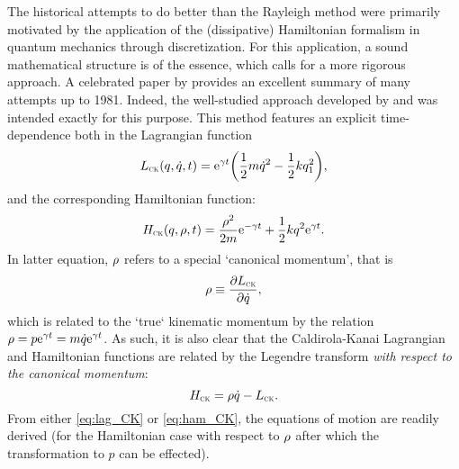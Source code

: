 The historical attempts to do better than the Rayleigh method were primarily motivated by the application of the (dissipative) Hamiltonian formalism in quantum mechanics through discretization. For this application, a sound mathematical structure is of the essence, which calls for a more rigorous approach. A celebrated paper by
\citet{Dekker1981} provides an excellent summary of many attempts up to 1981. Indeed, the well-studied approach developed by \citet{Caldirola1941} and \citet{Kanai1948} was intended exactly for this purpose. This method features an explicit time-dependence both in the Lagrangian function
\begin{equation}
    L_\text{\tiny{\textsc{CK}}}(q, \dot{q}, t) = \mathrm{e}^{\gamma t}\qty(\frac{1}{2}m\dot{q}^2 - \frac{1}{2}kq_1^2),
    \label{eq:lag_CK}
\end{equation}
and the corresponding Hamiltonian function:
\begin{equation}
    H_\text{\tiny{\textsc{CK}}}(q, \rho, t) = \frac{\rho^2}{2m}\mathrm{e}^{-\gamma t} + \frac{1}{2}kq^2\mathrm{e}^{\gamma t}.
    \label{eq:ham_CK}
\end{equation}
In latter equation, $\rho$ refers to a special `canonical momentum', that is
\begin{equation}
    \rho \equiv \pdv{\ensuremath{L_\text{\tiny{\textsc{CK}}}}}{\dot{q}},
    \label{eq:can_momentum}
\end{equation}
which is related to the `true` kinematic momentum by the relation $\rho = p\mathrm{e}^{\gamma
t} = m\dot{q}\mathrm{e}^{\gamma t}$. As such, it is also clear that the Caldirola-Kanai Lagrangian and Hamiltonian functions are related by the Legendre transform \emph{with respect to the canonical momentum}:
$$ H_\text{\tiny{\textsc{CK}}} = \rho \dot{q} - L_\text{\tiny{\textsc{CK}}}. $$
From either \cref{eq:lag_CK} or \cref{eq:ham_CK}, the equations of motion are readily
derived (for the Hamiltonian case with respect to $\rho$ after which the transformation to $p$ can be effected).
